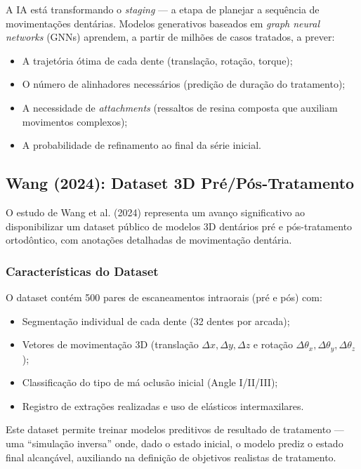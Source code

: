 A IA está transformando o \textit{staging} --- a etapa de planejar a sequência de movimentações dentárias. Modelos generativos baseados em \textit{graph neural networks} (GNNs) aprendem, a partir de milhões de casos tratados, a prever:
\begin{itemize}
    \item A trajetória ótima de cada dente (translação, rotação, torque);
    \item O número de alinhadores necessários (predição de duração do tratamento);
    \item A necessidade de \textit{attachments} (ressaltos de resina composta que auxiliam movimentos complexos);
    \item A probabilidade de refinamento ao final da série inicial.
\end{itemize}

\subsection{Wang (2024): Dataset 3D Pré/Pós-Tratamento}

O estudo de Wang et al. (2024) representa um avanço significativo ao disponibilizar um dataset público de modelos 3D dentários pré e pós-tratamento ortodôntico, com anotações detalhadas de movimentação dentária.

\subsubsection{Características do Dataset}

O dataset contém 500 pares de escaneamentos intraorais (pré e pós) com:
\begin{itemize}
    \item Segmentação individual de cada dente (32 dentes por arcada);
    \item Vetores de movimentação 3D (translação $\Delta x, \Delta y, \Delta z$ e rotação $\Delta\theta_{x}, \Delta\theta_{y}, \Delta\theta_{z}$);
    \item Classificação do tipo de má oclusão inicial (Angle I/II/III);
    \item Registro de extrações realizadas e uso de elásticos intermaxilares.
\end{itemize}

Este dataset permite treinar modelos preditivos de resultado de tratamento --- uma ``simulação inversa'' onde, dado o estado inicial, o modelo prediz o estado final alcançável, auxiliando na definição de objetivos realistas de tratamento.

